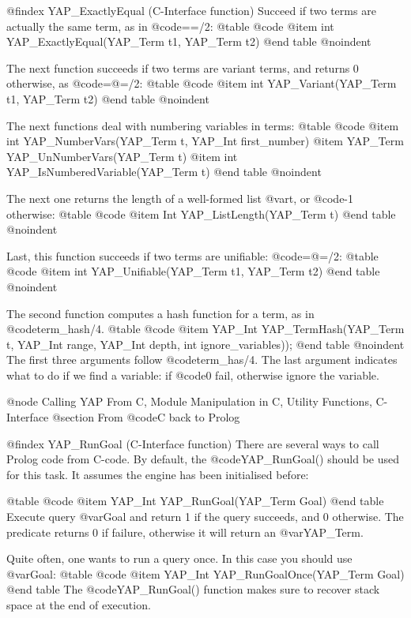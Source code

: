 @findex YAP_ExactlyEqual (C-Interface function)
Succeed if two terms are actually the same term, as in
@code{==/2}:
@table @code
@item      int      YAP_ExactlyEqual(YAP_Term t1, YAP_Term t2)
@end table
@noindent

The next function succeeds if two terms are variant terms, and returns
0 otherwise, as
@code{=@=/2}:
@table @code
 @item     int      YAP_Variant(YAP_Term t1, YAP_Term t2)
@end table
@noindent

The next functions deal with numbering variables in terms:
@table @code
 @item     int      YAP_NumberVars(YAP_Term t, YAP_Int first_number)
 @item     YAP_Term YAP_UnNumberVars(YAP_Term t)
 @item     int      YAP_IsNumberedVariable(YAP_Term t)
@end table
@noindent

The next one returns the length of a well-formed list @var{t}, or
@code{-1} otherwise:
@table @code
@item      Int      YAP_ListLength(YAP_Term t)
@end table
@noindent


Last, this function succeeds if two terms are unifiable:
@code{=@=/2}:
@table @code
 @item     int      YAP_Unifiable(YAP_Term t1, YAP_Term t2)
@end table
@noindent

The second function computes a hash function for a term, as in
@code{term_hash/4}.
@table @code
 @item    YAP_Int    YAP_TermHash(YAP_Term t, YAP_Int range, YAP_Int depth, int  ignore_variables));
@end table
@noindent
The first three arguments follow @code{term_has/4}. The last argument
indicates what to do if we find a variable: if @code{0} fail, otherwise
ignore the variable. 

@node Calling YAP From C, Module Manipulation in C, Utility Functions, C-Interface
@section From @code{C} back to Prolog

@findex YAP_RunGoal (C-Interface function)
There are several ways to call Prolog code from C-code. By default, the
@code{YAP_RunGoal()} should be used for this task. It assumes the engine
has been initialised before:

@table @code
@item  YAP_Int YAP_RunGoal(YAP_Term Goal)
@end table
Execute query @var{Goal} and return 1 if the query succeeds, and 0
otherwise. The predicate returns 0 if failure, otherwise it will return
an @var{YAP_Term}. 

Quite often, one wants to run a query once. In this case you should use
@var{Goal}:
@table @code
 @item YAP_Int YAP_RunGoalOnce(YAP_Term Goal)
@end table
The  @code{YAP_RunGoal()} function makes sure to recover stack space at
the end of execution.

